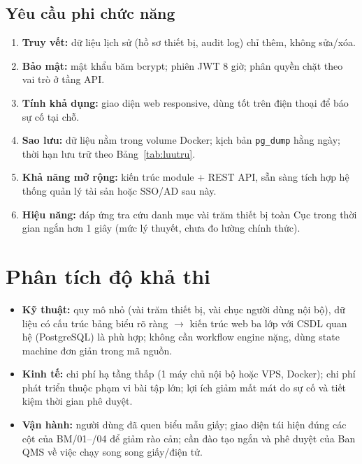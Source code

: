 \subsection{Yêu cầu phi chức năng}

\begin{enumerate}[label=\textbf{NFR-\arabic*.}]
  \item \textbf{Truy vết:} dữ liệu lịch sử (hồ sơ thiết bị, audit log) chỉ thêm, không sửa/xóa.
  \item \textbf{Bảo mật:} mật khẩu băm bcrypt; phiên JWT 8 giờ; phân quyền chặt theo vai trò ở tầng API.
  \item \textbf{Tính khả dụng:} giao diện web responsive, dùng tốt trên điện thoại để báo sự cố tại chỗ.
  \item \textbf{Sao lưu:} dữ liệu nằm trong volume Docker; kịch bản \texttt{pg\_dump} hằng ngày; thời hạn lưu trữ theo Bảng~\ref{tab:luutru}.
  \item \textbf{Khả năng mở rộng:} kiến trúc module + REST API, sẵn sàng tích hợp hệ thống quản lý tài sản hoặc SSO/AD sau này.
  \item \textbf{Hiệu năng:} đáp ứng tra cứu danh mục vài trăm thiết bị toàn Cục trong thời gian ngắn hơn 1 giây (mức lý thuyết, chưa đo lường chính thức).
\end{enumerate}

\section{Phân tích độ khả thi}

\begin{itemize}
  \item \textbf{Kỹ thuật:} quy mô nhỏ (vài trăm thiết bị, vài chục người dùng nội bộ), dữ liệu có cấu trúc bảng biểu rõ ràng $\rightarrow$ kiến trúc web ba lớp với CSDL quan hệ (PostgreSQL) là phù hợp; không cần workflow engine nặng, dùng state machine đơn giản trong mã nguồn.
  \item \textbf{Kinh tế:} chi phí hạ tầng thấp (1 máy chủ nội bộ hoặc VPS, Docker); chi phí phát triển thuộc phạm vi bài tập lớn; lợi ích giảm mất mát do sự cố và tiết kiệm thời gian phê duyệt.
  \item \textbf{Vận hành:} người dùng đã quen biểu mẫu giấy; giao diện tái hiện đúng các cột của BM/01--/04 để giảm rào cản; cần đào tạo ngắn và phê duyệt của Ban QMS về việc chạy song song giấy/điện tử.
\end{itemize}
